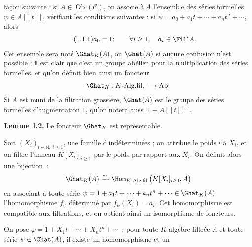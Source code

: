 façon suivante : si \(A\in\operatorname{Ob}(\mathcal C)\), on associe à \(A\) l'ensemble des séries formelles \(\psi\in A[[t]]\), vérifiant les conditions suivantes : si \(\psi=a_0+a_1t+\cdots+a_nt^n+\cdots\), alors
\begin{equation}\tag{1.1.1}
  a_0=1;\qquad \forall i\geq 1,\quad a_i\in\Fil^i A .
\end{equation}
Cet ensemble sera noté \(\Ghat_K(A)\), ou \(\Ghat(A)\) si aucune confusion n'est possible ; il est clair que c'est un groupe abélien pour la multiplication des séries formelles, et qu'on définit bien ainsi un foncteur
\[
  \Ghat_K:K\text{-Alg.fil.}\longrightarrow \mathrm{Ab}.
\]
Si \(A\) est muni de la filtration grossière, \(\Ghat(A)\) est le groupe des séries formelles d'augmentation \(1\), qu'on notera aussi \(1+A[[t]]^+\).

\textbf{Lemme 1.2.} Le foncteur \(\Ghat_K\) est représentable.

Soit \((X_i)_{i\in\mathbb N,\ i\geq 1}\), une famille d'indéterminées ; on attribue le poids \(i\) à \(X_i\), et on filtre l'anneau \(K[X_i]_{i\geq 1}\) par le poids par rapport aux \(X_i\). On définit alors une bijection~:
\[
  \Ghat_K(A)\xrightarrow{\sim}
  \Hom_{K\text{-Alg.fil.}}\bigl(K[X_i]_{i\geq 1},A\bigr)
\]
en associant à toute série \(\psi=1+a_1t+\cdots+a_nt^n+\cdots\in\Ghat_K(A)\) l'homomorphisme \(f_\psi\) déterminé par \(f_\psi(X_i)=a_i\). Cet homomorphisme est compatible aux filtrations, et on obtient ainsi un isomorphisme de foncteurs.

On pose \(\varphi=1+X_1t+\cdots+X_nt^n+\cdots\)~; pour toute \(K\)-algèbre filtrée \(A\) et toute série \(\psi\in\Ghat(A)\), il existe un homomorphisme et un
